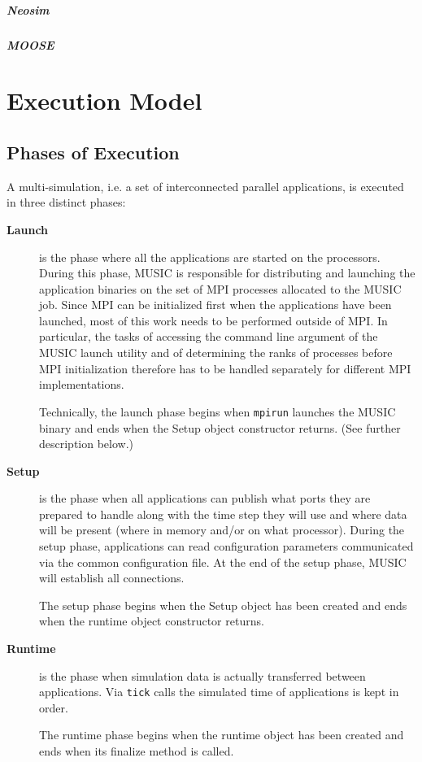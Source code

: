 \documentclass[a4paper,twoside]{report}
\begin{document}
\begin{metatext}
\paragraph{Neosim}

\paragraph{MOOSE}
\end{metatext}

\chapter{Execution Model}

\section{Phases of Execution}

A multi-simulation, i.e. a set of interconnected parallel
applications, is executed in three distinct phases:
\begin{description}
\item[\textbf{Launch}] is the phase where all the
  applications are started on the processors.  During this phase,
  MUSIC is responsible for distributing and launching the application
  binaries on the set of MPI processes allocated to the MUSIC job.
  Since MPI can be initialized first when the applications have been
  launched, most of this work needs to be performed outside of MPI.
  In particular, the tasks of accessing the command line argument of
  the MUSIC launch utility and of determining the ranks of processes
  before MPI initialization therefore has to be handled separately for
  different MPI implementations.

  Technically, the launch phase begins when \texttt{mpirun} launches
  the MUSIC binary and ends when the Setup object constructor
  returns.  (See further description below.)

\item[\textbf{Setup}] is the phase when all
  applications can publish what ports they are prepared to handle
  along with the time step they will use and where data will be
  present (where in memory and/or on what processor).  During the
  setup phase, applications can read configuration parameters
  communicated via the common configuration file.  At the end of the
  setup phase, MUSIC will establish all connections.

  The setup phase begins when the Setup object has been created and
  ends when the runtime object constructor returns.

\item[\textbf{Runtime}] is the phase when
  simulation data is actually transferred between applications.  Via
  \texttt{tick} calls the simulated time of applications is
  kept in order.

  The runtime phase begins when the runtime object has been created
  and ends when its finalize method is called.
\end{description}
\end{document}
